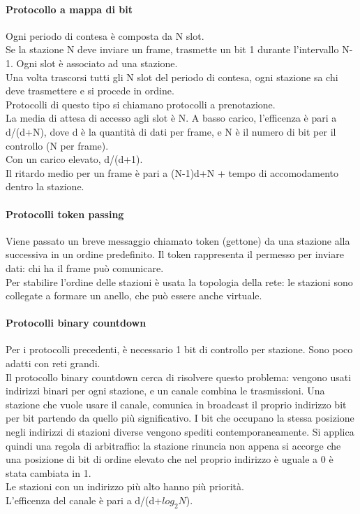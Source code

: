 \documentclass{article}
\begin{document}
\paragraph{Protocollo a mappa di bit} Ogni periodo di contesa è composta da N slot. \\
Se la stazione N deve inviare un frame, trasmette un bit 1 durante l'intervallo N-1. Ogni slot è associato ad una stazione. \\
Una volta trascorsi tutti gli N slot del periodo di contesa, ogni stazione sa chi deve trasmettere e si procede in ordine.\\
Protocolli di questo tipo si chiamano protocolli a prenotazione. \\
La media di attesa di accesso agli slot è N.
A basso carico, l'efficenza è pari a d/(d+N), dove d è la quantità di dati per frame, e N è il numero di bit per il controllo (N per frame).\\ Con un carico elevato, d/(d+1). \\ Il ritardo medio per un frame è pari a (N-1)d+N + tempo di accomodamento dentro la stazione.
\paragraph{Protocolli token passing} Viene passato un breve messaggio chiamato token (gettone) da una stazione alla successiva in un ordine predefinito. Il token rappresenta il permesso per inviare dati: chi ha il frame può comunicare.\\
Per stabilire l'ordine delle stazioni è usata la topologia della rete: le stazioni sono collegate a formare un anello, che può essere anche virtuale.
\paragraph{Protocolli binary countdown} Per i protocolli precedenti, è necessario 1 bit di controllo per stazione. Sono poco adatti con reti grandi. \\
Il protocollo binary countdown cerca di risolvere questo problema: vengono usati indirizzi binari per ogni stazione, e un canale combina le trasmissioni. Una stazione che vuole usare il canale, comunica in broadcast il proprio indirizzo bit per bit partendo da quello più significativo. I bit che occupano la stessa posizione negli indirizzi di stazioni diverse vengono spediti contemporaneamente. Si applica quindi una regola di arbitraffio: la stazione rinuncia non appena si accorge che una posizione di bit di ordine elevato che nel proprio indirizzo è uguale a 0 è stata cambiata in 1.\\
Le stazioni con un indirizzo più alto hanno più priorità.\\
L'efficenza del canale è pari a d/(d+$log_2 N$).
\end{document}

